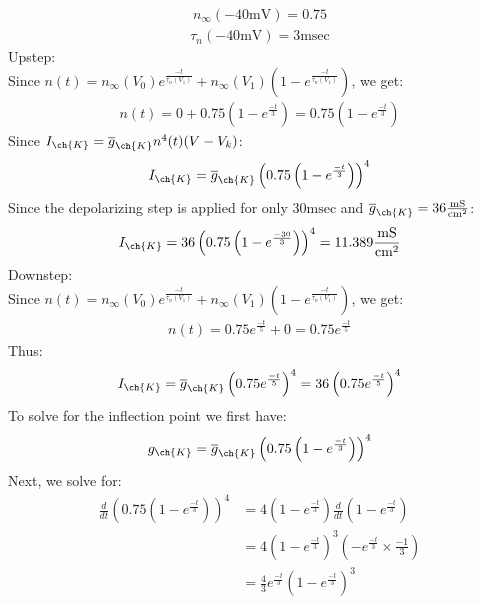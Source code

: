 \documentclass[11pt]{article}
\begin{document}
\begin{enumerate}[label=\arabic*.]
\begin{enumerate}[label=(\alph*)]
\begin{align*}
n_{\infty}(-40 \text{mV}) = 0.75
\end{align*}
\begin{align*}
\tau_{n}(-40 \text{mV}) = 3 \text{msec}
\end{align*}
Upstep:
\\
Since $n(t) = n_{\infty}(V_0) e^{\frac{-t} {\tau_n(V_1)}} + n_{\infty}(V_1) \left(1 - e^{\frac{-t} {\tau_n(V_1)}}\right)$, we get:
\begin{align*}
n(t) = 0 + 0.75 \left(1 - e^{\frac{-t} {3}}\right) = 0.75 \left(1 - e^{\frac{-t} {3}}\right)
\end{align*}
Since $I_{\ch{K}} = \overline{g}_{\ch{K}} n^4(t) (V - V_k)$:
\begin{align*}
I_{\ch{K}} = \overline{g}_{\ch{K}} \left(0.75 \left(1 - e^{\frac{-t} {3}}\right)\right)^4
\end{align*}
Since the depolarizing step is applied for only $30 \text{msec}$ and $\overline{g}_{\ch{K}} = 36 \frac{\text{mS}} {\text{cm}^2}$:
\begin{align*}
I_{\ch{K}} = 36 \left(0.75 \left(1 - e^{\frac{-30} {3}}\right)\right)^4 = 11.389 \frac{\text{mS}} {\text{cm}^2}
\end{align*}
Downstep:
\\
Since $n(t) = n_{\infty}(V_0) e^{\frac{-t} {\tau_n(V_1)}} + n_{\infty}(V_1) \left(1 - e^{\frac{-t} {\tau_n(V_1)}}\right)$, we get:
\begin{align*}
n(t) = 0.75 e^{\frac{-t} {5}} + 0 = 0.75 e^{\frac{-t} {5}}
\end{align*}
Thus:
\begin{align*}
I_{\ch{K}} = \overline{g}_{\ch{K}} \left(0.75 e^{\frac{-t} {5}}\right)^4 = 36 \left(0.75 e^{\frac{-t} {5}}\right)^4
\end{align*}
To solve for the inflection point we first have:
\begin{align*}
g_{\ch{K}} = \overline{g}_{\ch{K}} \left(0.75 \left(1 - e^{\frac{-t} {3}}\right)\right)^4
\end{align*}
Next, we solve for:
\begin{align*}
\frac{d} {dt} \left(0.75 \left(1 - e^{\frac{-t} {3}}\right)\right)^4 &= 4 \left(1 - e^{\frac{-t} {3}}\right) \frac{d} {dt} \left(1 - e^{\frac{-t} {3}}\right) \\
&= 4 \left(1 - e^{\frac{-t} {3}}\right)^3 \left(- e^{\frac{-t} {3}} \times \frac{-1} {3}\right) \\
&= \frac{4} {3} e^{\frac{-t} {3}} \left(1 - e^{\frac{-t} {3}}\right)^3
\end{align*}

\end{enumerate}
\end{enumerate}
\end{document}
